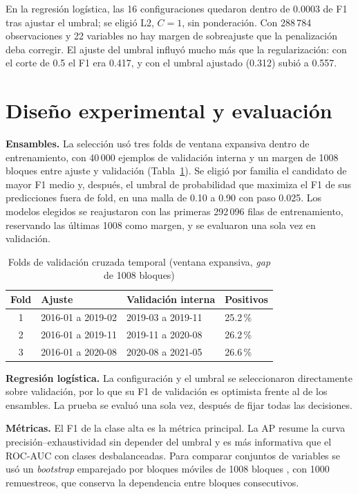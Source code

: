 \documentclass[conference]{IEEEtran}
\begin{document}
En la regresión logística, las 16 configuraciones quedaron dentro de 0.0003 de F1 tras ajustar el umbral; se eligió L2, $C=1$, sin ponderación. Con 288\,784 observaciones y 22 variables no hay margen de sobreajuste que la penalización deba corregir. El ajuste del umbral influyó mucho más que la regularización: con el corte de 0.5 el F1 era 0.417, y con el umbral ajustado (0.312) subió a 0.557.

\section{Diseño experimental y evaluación}
\textbf{Ensambles.} La selección usó tres folds de ventana expansiva dentro de entrenamiento, con 40\,000 ejemplos de validación interna y un margen de 1008 bloques entre ajuste y validación (Tabla~\ref{tab:folds}). Se eligió por familia el candidato de mayor F1 medio y, después, el umbral de probabilidad que maximiza el F1 de sus predicciones fuera de fold, en una malla de 0.10 a 0.90 con paso 0.025. Los modelos elegidos se reajustaron con las primeras 292\,096 filas de entrenamiento, reservando las últimas 1008 como margen, y se evaluaron una sola vez en validación.

\begin{table}[htbp]
\caption{Folds de validación cruzada temporal (ventana expansiva, \textit{gap} de 1008 bloques)}
\label{tab:folds}
\centering
\small
\begin{tabular}{clll}
\toprule
Fold & Ajuste & Validación interna & Positivos \\
\midrule
1 & 2016-01 a 2019-02 & 2019-03 a 2019-11 & 25.2\,\% \\
2 & 2016-01 a 2019-11 & 2019-11 a 2020-08 & 26.2\,\% \\
3 & 2016-01 a 2020-08 & 2020-08 a 2021-05 & 26.6\,\% \\
\bottomrule
\end{tabular}
\end{table}

\textbf{Regresión logística.} La configuración y el umbral se seleccionaron directamente sobre validación, por lo que su F1 de validación es optimista frente al de los ensambles. La prueba se evaluó una sola vez, después de fijar todas las decisiones.

\textbf{Métricas.} El F1 de la clase alta es la métrica principal. La AP resume la curva precisión--exhaustividad sin depender del umbral y es más informativa que el ROC-AUC con clases desbalanceadas. Para comparar conjuntos de variables se usó un \textit{bootstrap} emparejado por bloques móviles de 1008 bloques \cite{kunsch1989}, con 1000 remuestreos, que conserva la dependencia entre bloques consecutivos.
\end{document}

